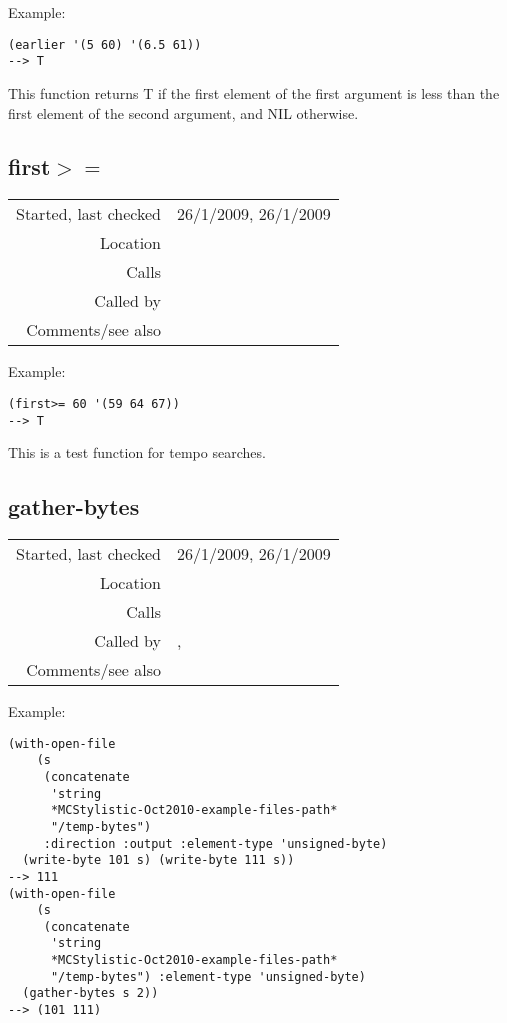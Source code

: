 \vspace{0.5cm}
\noindent Example:
\begin{verbatim}
(earlier '(5 60) '(6.5 61))
--> T
\end{verbatim}

\noindent This function returns T if the first element
of the first argument is less than the first element
of the second argument, and NIL otherwise.


\subsection*{first$>=$}\label{fun:first>=}

\vspace{0.3cm}
\begin{tabular}{r|p{8cm}}
Started, last checked & 26/1/2009, 26/1/2009 \\
Location & \nameref{sec:MIDI-import} \\
Calls & \\
Called by & \nameref{fun:ticks-ms} \\
Comments/see also &
\end{tabular}

\vspace{0.5cm}
\noindent Example:
\begin{verbatim}
(first>= 60 '(59 64 67))
--> T
\end{verbatim}

\noindent This is a test function for tempo
searches.


\subsection*{gather-bytes}\label{fun:gather-bytes}

\vspace{0.3cm}
\begin{tabular}{r|p{8cm}}
Started, last checked & 26/1/2009, 26/1/2009 \\
Location & \nameref{sec:MIDI-import} \\
Calls & \\
Called by & \nameref{fun:get-metadata}, \nameref{fun:read-track} \\
Comments/see also &
\end{tabular}

\vspace{0.5cm}
\noindent Example:
\begin{verbatim}
(with-open-file
    (s
     (concatenate
      'string
      *MCStylistic-Oct2010-example-files-path*
      "/temp-bytes")
     :direction :output :element-type 'unsigned-byte)
  (write-byte 101 s) (write-byte 111 s))
--> 111
(with-open-file
    (s
     (concatenate
      'string
      *MCStylistic-Oct2010-example-files-path*
      "/temp-bytes") :element-type 'unsigned-byte)
  (gather-bytes s 2))
--> (101 111)
\end{verbatim}

